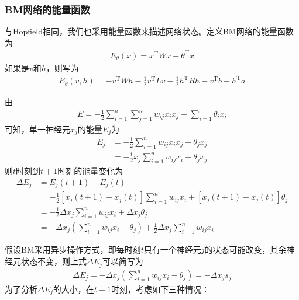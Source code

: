         \subsubsection{BM网络的能量函数}
            \par
            与Hopfield相同，我们也采用能量函数来描述网络状态。定义BM网络的能量函数为
            \begin{align*}
            E_\theta(x) = x^\mathrm{T}Wx + \theta^\mathrm{T}x
            \end{align*}
            如果是$v$和$h$，则写为
            \begin{align*}
            E_\theta(v,h) = -v^\mathrm{T}Wh- \frac{1}{2} v^\mathrm{T}L v - \frac{1}{2} h^\mathrm{T} R h- v^\mathrm{T}b- h^\mathrm{T}a
            \end{align*}
            \par
            由
            \begin{align*}
            E = -\frac{1}{2} \sum_{i=1}^n\sum_{j=1}^n w_{ij}x_ix_j +\sum_{i=1}\theta_i x_i
            \end{align*}
            可知，单一神经元$x_j$的能量$E_j$为
            \begin{align*}
            E_j & = -\frac{1}{2}\sum_{i=1}^n w_{ij}x_ix_j+\theta_jx_j\\
            & =-\frac{1}{2} x_j\sum_{i=1}^n w_{ij}x_i + \theta_j x_j
            \end{align*}
            则$t$时刻到$t+1$时刻的能量变化为
            \begin{align*}
            \Delta E_j & = E_j(t+1) - E_j(t) \\
            & =-\frac{1}{2} [x_j(t+1) - x_j(t)] \sum_{i=1}^n w_{ij} x_i + [x_j(t+1) - x_j(t)]\theta_j\\
            & =-\frac{1}{2}\Delta x_j \sum_{i=1}^nw_{ij} x_i + \Delta x_j \theta_j\\
            & = -\Delta x_j \left( \sum_{i=1}^nw_{ij}x_i - \theta_j \right) + \frac{1}{2}\Delta x_j \sum_{i=1}^nw_{ij}x_i
            \end{align*}
            \par
            假设BM采用异步操作方式，即每时刻$t$只有一个神经元$j$的状态可能改变，其余神经元状态不变，则上式$\Delta E_j$可以简写为
            \begin{align*}
            \Delta E_j = -\Delta x_j \left( \sum_{i=1}^n w_{ij}x_i -\theta_j \right) = -\Delta x_js_j
            \end{align*}
            为了分析$\Delta E_j$的大小，在$t+1$时刻，考虑如下三种情况：
